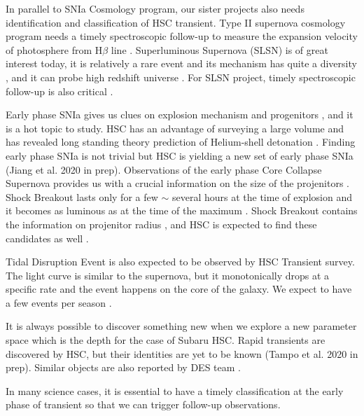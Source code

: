 \documentclass[useamsfonts]{pasj01}
\begin{document}
In parallel to SNIa Cosmology program, our sister projects also needs identification and classification of HSC transient.   
Type II supernova cosmology program needs a timely spectroscopic follow-up to measure the expansion velocity of photosphere from H$\beta$ line \citep{dejaeger17a}.
Superluminous Supernova (SLSN) is of great interest today, it is relatively a rare event\citep{quimby11a} and its mechanism has quite a diversity \citep{galyam12a,moriya12a}, and it can probe high redshift universe \citep{cooke12a}.    
For SLSN project, timely spectroscopic follow-up is also critical \citep{moriya19a,curtin19a}.

Early phase SNIa gives us clues on explosion mechanism \citep{maeda18a} and progenitors \citep{cao15a}, and it is a hot topic to study.
HSC has an advantage of surveying a large volume and has revealed long standing theory prediction of Helium-shell detonation \citep{jiang18a}.
Finding early phase SNIa is not trivial but HSC is yielding a new set of early phase SNIa (Jiang et al. 2020 in prep).
Observations of the early phase Core Collapse Supernova provides us with a crucial information on the size of the projenitors \citep{thompson03a,chevalier11a}.  Shock Breakout lasts only for a few $\sim$ several hours at the time of explosion and it becomes as luminous as at the time of the maximum \citep{gezari08a}. 
Shock Breakout contains the information on projenitor radius \citep{nakar10a}, and HSC is expected to find these candidates as well \citep{tominaga11a}.

Tidal Disruption Event \citep[TDE]{gezari08b,holoien14a} is also expected to be observed by HSC Transient survey.  The light curve is similar to
the supernova, but it monotonically drops at a specific rate \citep[$t^{-5/3}$]{lodato11a} and the event happens on the core of the galaxy.  
We expect to have a few events per season \citep{kochanek16a}.

It is always possible to discover something new when we explore a new parameter space which is the depth for the case
of Subaru HSC.   Rapid transients are discovered by HSC, but their identities are yet to be known (Tampo et al.  2020 in prep).  
Similar objects are also reported by DES team \citep{pursianinen18a}.

In many science cases, it is essential to have a timely classification at the early phase of transient so that we can trigger follow-up observations.

\end{document}
